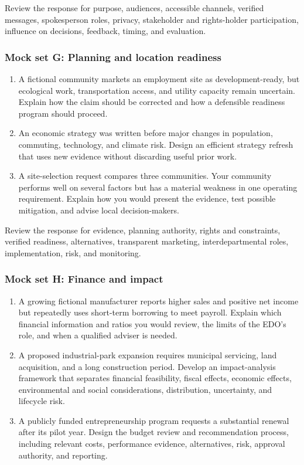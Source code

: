 \documentclass[11pt,letterpaper,oneside,openany]{book}
\begin{document}
Review the response for purpose, audiences, accessible channels, verified messages, spokesperson roles, privacy, stakeholder and rights-holder participation, influence on decisions, feedback, timing, and evaluation.


\subsubsection[Mock set G: Planning and location readiness]{Mock set G: Planning and location readiness}
\begin{enumerate}
\item A fictional community markets an employment site as development-ready, but ecological work, transportation access, and utility capacity remain uncertain. Explain how the claim should be corrected and how a defensible readiness program should proceed.
\item An economic strategy was written before major changes in population, commuting, technology, and climate risk. Design an efficient strategy refresh that uses new evidence without discarding useful prior work.
\item A site-selection request compares three communities. Your community performs well on several factors but has a material weakness in one operating requirement. Explain how you would present the evidence, test possible mitigation, and advise local decision-makers.
\end{enumerate}


Review the response for evidence, planning authority, rights and constraints, verified readiness, alternatives, transparent marketing, interdepartmental roles, implementation, risk, and monitoring.


\subsubsection[Mock set H: Finance and impact]{Mock set H: Finance and impact}
\begin{enumerate}
\item A growing fictional manufacturer reports higher sales and positive net income but repeatedly uses short-term borrowing to meet payroll. Explain which financial information and ratios you would review, the limits of the EDO's role, and when a qualified adviser is needed.
\item A proposed industrial-park expansion requires municipal servicing, land acquisition, and a long construction period. Develop an impact-analysis framework that separates financial feasibility, fiscal effects, economic effects, environmental and social considerations, distribution, uncertainty, and lifecycle risk.
\item A publicly funded entrepreneurship program requests a substantial renewal after its pilot year. Design the budget review and recommendation process, including relevant costs, performance evidence, alternatives, risk, approval authority, and reporting.
\end{enumerate}
\end{document}
